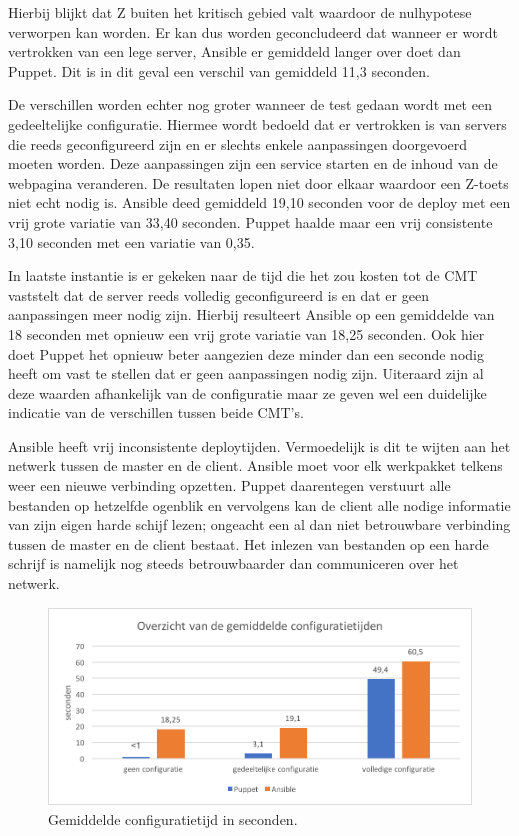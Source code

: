 Hierbij blijkt dat Z buiten het kritisch gebied valt waardoor de nulhypotese verworpen kan worden. Er kan dus worden geconcludeerd dat wanneer er wordt vertrokken van een lege server, Ansible er gemiddeld langer over doet dan Puppet. Dit is in dit geval een verschil van gemiddeld 11,3 seconden. 

De verschillen worden echter nog groter wanneer de test gedaan wordt met een gedeeltelijke configuratie. Hiermee wordt bedoeld dat er vertrokken is van servers die reeds geconfigureerd zijn en er slechts enkele aanpassingen doorgevoerd moeten worden. Deze aanpassingen zijn een service starten en de inhoud van de webpagina veranderen. De resultaten lopen niet door elkaar waardoor een Z-toets niet echt nodig is. Ansible deed gemiddeld 19,10 seconden voor de \gls{deploy} met een vrij grote variatie van 33,40 seconden. Puppet haalde maar een vrij consistente 3,10 seconden met een variatie van 0,35.

In laatste instantie is er gekeken naar de tijd die het zou kosten tot de \gls{CMT} vaststelt dat de server reeds volledig geconfigureerd is en dat er geen aanpassingen meer nodig zijn. Hierbij resulteert Ansible op een gemiddelde van 18 seconden met opnieuw een vrij grote variatie van 18,25 seconden. Ook hier doet Puppet het opnieuw beter aangezien deze minder dan een seconde nodig heeft om vast te stellen dat er geen aanpassingen nodig zijn. Uiteraard zijn al deze waarden afhankelijk van de configuratie maar ze geven wel een duidelijke indicatie van de verschillen tussen beide \gls{CMT}'s.

Ansible heeft vrij inconsistente deploytijden. Vermoedelijk is dit te wijten aan het netwerk tussen de master en de client. Ansible moet voor elk \gls{werkpakket} telkens weer een nieuwe verbinding opzetten. Puppet daarentegen verstuurt alle bestanden op hetzelfde ogenblik en vervolgens kan de client alle nodige informatie van zijn eigen harde schijf lezen; ongeacht een al dan niet betrouwbare verbinding tussen de master en de client bestaat. Het inlezen van bestanden op een harde schrijf is namelijk nog steeds betrouwbaarder dan communiceren over het netwerk.

\begin{figure}
	\includegraphics[width=\linewidth]{img/overzichtgemiddeldeconfigtijd.png} 
	\caption{Gemiddelde configuratietijd in seconden.}  

\end{figure}



